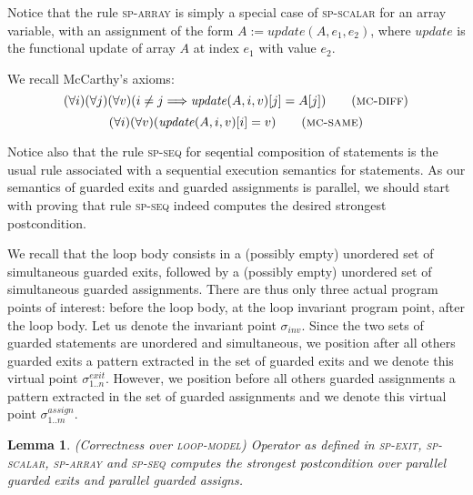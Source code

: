 \documentclass[a4paper,10pt]{article}
\newcommand{\impl}{\ensuremath{\Longrightarrow}}
\newcommand{\update}[3]{\ensuremath{\mathit{update}{(#1,#2,#3)}}\xspace}
\newcommand{\loopmodel}{\textsc{loop-model}\xspace}
\newcommand{\state}[1]{\ensuremath{\sigma_{\mathit{#1}}\xspace}}
\newcommand{\vstate}[2]{\ensuremath{\sigma^{\mathit{#1}}_{\mathit{#2}}\xspace}}
\newcommand{\spexit}{\textsc{sp-exit}\xspace}
\newcommand{\spscalar}{\textsc{sp-scalar}\xspace}
\newcommand{\sparray}{\textsc{sp-array}\xspace}
\newcommand{\spseq}{\textsc{sp-seq}\xspace}
\newcommand{\mcdiff}{\textsc{mc-diff}\xspace}
\newcommand{\mcsame}{\textsc{mc-same}\xspace}
\newtheorem{lemma}[theorem]{Lemma}
\begin{document}
Notice that the rule \sparray is simply a special case of \spscalar for an
array variable, with an assignment of the form $A := \update{A}{e_1}{e_2}$,
where $\mathit{update}$ is the functional update of array $A$ at index $e_1$
with value $e_2$.

We recall McCarthy's axioms:
\begin{equation}
(\forall i)(\forall j)(\forall v)(i \neq j \impl \update{A}{i}{v}[j] = A[j])
\tag{\mcdiff}
\end{equation}
\begin{equation}
(\forall i)(\forall v)(\update{A}{i}{v}[i] = v) \tag{\mcsame}
\end{equation}

Notice also that the rule \spseq for seqential composition of statements is the
usual rule associated with a sequential execution semantics for statements. As
our semantics of guarded exits and guarded assignments is parallel, we should
start with proving that rule \spseq indeed computes the desired strongest
postcondition. 

We recall that the loop body consists in a (possibly empty) unordered set of 
simultaneous guarded exits, followed by a (possibly empty) unordered set of 
simultaneous guarded assignments. There are thus only three actual program points 
of interest: before the loop body, at the loop invariant program point, after the loop body. 
Let us denote the invariant point \state{inv}. Since the two sets of guarded statements are
unordered and simultaneous, we position after all others guarded exits a pattern extracted 
in the set of guarded exits and we denote this virtual point \vstate{exit}{1..n}. However, 
we position before all others guarded assignments a pattern extracted in the set of guarded 
assignments and we denote this virtual point \vstate{assign}{1..m}. 

\begin{lemma}
  \emph{(\spostsym Correctness over \loopmodel)} Operator \spostsym as defined in \spexit,
  \spscalar, \sparray and \spseq computes the strongest postcondition over
  parallel guarded exits and parallel guarded assigns.
\label{lemma:sp-correctness}
\end{lemma}
\end{document}
